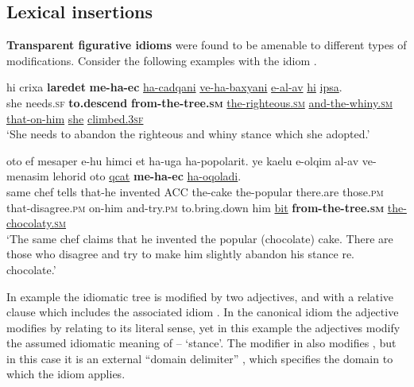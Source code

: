 \documentclass[output=paper]{langsci/langscibook}
\begin{document}
\subsection{Lexical insertions}
\label{sec:li}

\textbf{Transparent figurative idioms} were found to be amenable to different types of modifications. Consider the following examples with the idiom .

    \ea\label{ec-rc-mod}
        \gll hi crixa \textbf{laredet} \textbf{me-ha-{\ayin}ec} \underline{ha-cadqani} \underline{ve-ha-baxyani} \underline{{\shin}e-{\ayin}al-av} \underline{hi} \underline{{\tet}ipsa}.\\
            she needs.\textsc{sf} \textbf{to.descend} \textbf{from-the-tree.\textsc{sm}} \underline{the-righteous.\textsc{sm}} \underline{and-the-whiny.\textsc{sm}} \underline{that-on-him} \underline{she} \underline{climbed.\textsc{3sf}}\\
        \glt `She needs to abandon the righteous and whiny stance which she adopted.'
    \z

    \ea\label{ec-ins-int-ext-mod}
        \gll {\alef}oto {\shin}ef mesaper {\shin}e-hu himci {\alef}et ha-{\ayin}uga ha-popolarit. ye{\shin} ka{\alef}elu {\shin}e-{\het}olqim {\ayin}al-av ve-menasim lehorid {\alef}oto \underline{qcat} \textbf{me-ha-{\ayin}ec} \underline{ha-{\shin}oqoladi}.\\
            same chef tells that-he invented ACC the-cake the-popular there.are those.\textsc{pm} that-disagree.\textsc{pm} on-him and-try.\textsc{pm} to.bring.down him \underline{bit} \textbf{from-the-tree.\textsc{sm}} \underline{the-chocolaty.\textsc{sm}}\\
        \glt `The same chef claims that he invented the popular (chocolate) cake. There are those who disagree and try to make him slightly abandon his stance re. chocolate.'
    \z

In example  the idiomatic tree is modified by two adjectives, and with a relative clause which includes the associated idiom . In the canonical idiom the adjective  modifies  by relating to its literal sense, yet in this example the adjectives modify the assumed idiomatic meaning of  -- `stance'. The modifier  in  also modifies , but in this case it is an external ``domain delimiter'' \citep{ernst81}, which specifies the domain to which the idiom applies.
\end{document}
